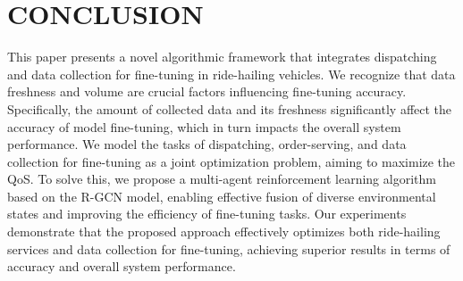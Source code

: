 \section{CONCLUSION}
This paper presents a novel algorithmic framework that integrates dispatching and data collection for fine-tuning in ride-hailing vehicles. We recognize that data freshness and volume are crucial factors influencing fine-tuning accuracy. Specifically, the amount of collected data and its freshness significantly affect the accuracy of model fine-tuning, which in turn impacts the overall system performance. We model the tasks of dispatching, order-serving, and data collection for fine-tuning as a joint optimization problem, aiming to maximize the QoS. To solve this, we propose a multi-agent reinforcement learning algorithm based on the R-GCN model, enabling effective fusion of diverse environmental states and improving the efficiency of fine-tuning tasks. Our experiments demonstrate that the proposed approach effectively optimizes both ride-hailing services and data collection for fine-tuning, achieving superior results in terms of accuracy and overall system performance.
